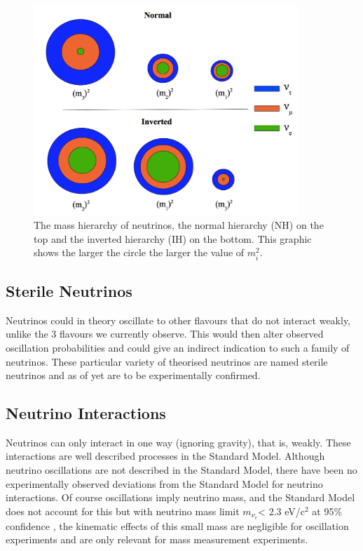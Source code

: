 \begin{figure}[htbp]
\begin{center}
\includegraphics[width=100mm]{Introduction/IntroductionFigs/MassHierarchy_v2.png}
\caption{The mass hierarchy of neutrinos, the normal hierarchy (NH) on the top and the inverted hierarchy (IH) on the bottom. This graphic shows the larger the circle the larger the value of $m_{i}^{2}$.}
\label{massHierarchyFig}
\end{center}
\end{figure}

\subsection{Sterile Neutrinos}
Neutrinos could in theory oscillate to other flavours that do not interact weakly, unlike the 3 flavours we currently observe. This would then alter observed oscillation probabilities and could give an indirect indication to such a family of neutrinos. These particular variety of theorised neutrinos are named sterile neutrinos and as of yet are to be experimentally confirmed. 

\subsection{Neutrino Interactions}
Neutrinos can only interact in one way (ignoring gravity), that is, weakly. These interactions are well described processes in the Standard Model. Although neutrino oscillations are not described in the Standard Model, there have been no experimentally observed deviations from the Standard Model for neutrino interactions. Of course oscillations imply neutrino mass, and the Standard Model does not account for this but with neutrino mass limit $m_{\nu_{e}}$< 2.3 eV/c$^{2}$ at 95\% confidence \cite{electronNeutrinoMassTritium}, the kinematic effects of this small mass are negligible for oscillation experiments and are only relevant for mass measurement experiments.

